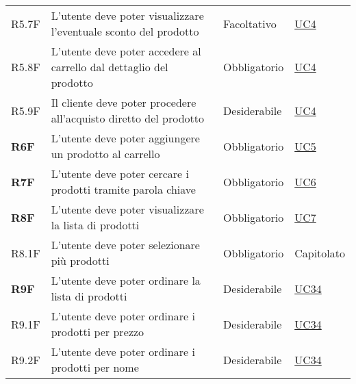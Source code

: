 \begin{center}
\begin{longtable}[!h]{p{50px} p{245px} p{75px} p{50px}}
        R5.7F                                 & L'utente deve poter visualizzare l'eventuale sconto del prodotto                                    & Facoltativo              & \hyperref[sec:UC4]{UC4}                        \\
        R5.8F                                 & L'utente deve poter accedere al carrello dal dettaglio del prodotto                                 & Obbligatorio             & \hyperref[sec:UC4]{UC4}                        \\
        R5.9F                                 & Il cliente deve poter procedere all'acquisto diretto del prodotto                                   & Desiderabile             & \hyperref[sec:UC4]{UC4}                        \\
        \textbf{R6F}                          & L'utente deve poter aggiungere un prodotto al carrello                                              & Obbligatorio             & \hyperref[sec:UC5]{UC5}                        \\
        \textbf{R7F}                          & L'utente deve poter cercare i prodotti tramite parola chiave                                        & Obbligatorio             & \hyperref[sec:UC6]{UC6}                        \\
        \textbf{R8F}                          & L'utente deve poter visualizzare la lista di prodotti                                               & Obbligatorio             & \hyperref[sec:UC7]{UC7}                        \\
        R8.1F                                 & L'utente deve poter selezionare più prodotti                                                        & Obbligatorio             & Capitolato                                     \\
        \textbf{R9F}                          & L'utente deve poter ordinare la lista di prodotti                                                   & Desiderabile             & \hyperref[sec:UC34]{UC34}                      \\
        R9.1F                                 & L'utente deve poter ordinare i prodotti per prezzo                                                  & Desiderabile             & \hyperref[sec:UC34]{UC34}                      \\
        R9.2F                                 & L'utente deve poter ordinare i prodotti per nome                                                    & Desiderabile             & \hyperref[sec:UC34]{UC34}                      \\

\end{longtable}
\end{center}
